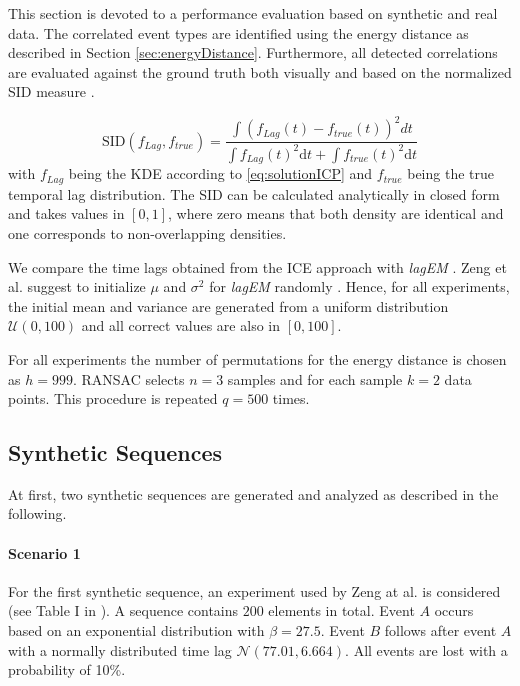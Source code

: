 \documentclass[conference]{IEEEtran}
\theoremstyle{examplestyle}
\begin{document}
This section is devoted to a performance evaluation based on synthetic and real data.
The correlated event types are identified using the energy distance as described in Section \ref{sec:energyDistance}.
Furthermore, all detected correlations are evaluated against the ground truth both visually and based on the normalized \ac{SID} measure \cite{Hanebeck2003}.

\begin{equation}
	\text{SID}(f_{Lag}, f_{true}) = \frac{\int \left( f_{Lag} (t) - f_{true}(t) \right)^2 d t}{\int f_{Lag} (t)^2 \text{d} t + \int f_{true}(t)^2 \text{d} t}
\end{equation}
with $f_{Lag}$ being the KDE according to \eqref{eq:solutionICP} and $f_{true}$ being the true temporal lag distribution. The SID can be calculated analytically in closed form and takes values in $[0,1]$, where zero means that both density are identical and one corresponds to non-overlapping densities.


We compare the time lags obtained from the \ac{ICE} approach with \textit{lagEM} \cite{Zeng2015}.
Zeng et al. suggest to initialize \(\mu\) and \(\sigma^2\) for \textit{lagEM} randomly \cite{Zeng2015}. Hence, for all experiments, the initial mean and variance are generated from a uniform distribution \(\mathcal{U}(0, 100)\) and all correct values are also in \([0, 100]\).


For all experiments the number of permutations for the energy distance is chosen as \(h = 999\). \ac{RANSAC} selects \(n = 3\) samples and for each sample \(k = 2\) data points. This procedure is repeated \(q = 500\) times.



\subsection{Synthetic Sequences}
At first, two synthetic sequences are generated and analyzed as described in the following.
\paragraph{Scenario 1}
For the first synthetic sequence, an experiment used by Zeng at al. is considered (see Table I in \cite{Zeng2015}). A sequence contains $200$ elements in total. Event \(A\) occurs based on an exponential distribution with \(\beta = 27.5\). Event \(B\) follows after event \(A\) with a normally distributed time lag \(\mathcal{N}(77.01, 6.664)\). All events are lost with a probability of 10\%.
\end{document}
